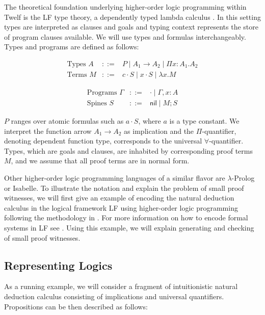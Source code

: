 \documentclass{llncs}
\newcommand{\comb}{\cdot}
\newcommand{\nil}{\mathsf{nil}}
\begin{document}
The theoretical foundation underlying higher-order logic programming
within Twelf is the LF type theory, a dependently
typed lambda calculus  \cite{Pfenning91lf}. In this setting types are interpreted as
clauses and goals and typing context represents the store of program
clauses available. We will use types and formulas
interchangeably. Types and programs are defined as follows: 

\begin{minipage}[b]{6cm}
\[
\begin{array}{lcl}
\mbox{Types } A & ::= & P \mid  A_1 \rightarrow A_2 \mid \Pi x:A_1.A_2 \\
\mbox{Terms }  M & ::= & c \comb S \mid x \comb S \mid \lambda x. M  
\end{array}
\]
\end{minipage}
\begin{minipage}[b]{6cm}
\[
\begin{array}{lcl}
\mbox{Programs }  \Gamma & ::= & \cdot \mid \Gamma, x:A \\
\mbox{Spines } S & ::= & \nil \mid M ; S
\end{array}
\]
\end{minipage}

$P$ ranges over atomic formulas such as $a \cdot S$, where $a$ is a
type constant. We interpret the function arrow $A_1 \rightarrow A_2$
as implication and the $\Pi$-quantifier, denoting dependent function
type, corresponds to the universal $\forall$-quantifier. Types, which
are goals and clauses, are inhabited by corresponding proof terms $M$,
and we assume that all proof terms are in normal form. 

Other higher-order logic programming languages of a similar
flavor are $\lambda$-Prolog \cite{Nadathur99cade} or
Isabelle\cite{Paulson86}. To illustrate the notation and explain the
problem of small proof witnesses, we will first give an example of
encoding the natural deduction calculus in the logical framework LF
using higher-order logic programming following the methodology in
\cite{Harper93jacm}. For more information on how to encode formal
systems in LF see \cite{Pfenning97}.  Using this example, we will
explain generating and checking of small proof witnesses.

\subsection{Representing Logics}
As a running example, we will consider a fragment of intuitionistic natural
deduction calculus consisting of implications and universal quantifiers. Propositions can
be then described as follows:
\end{document}
